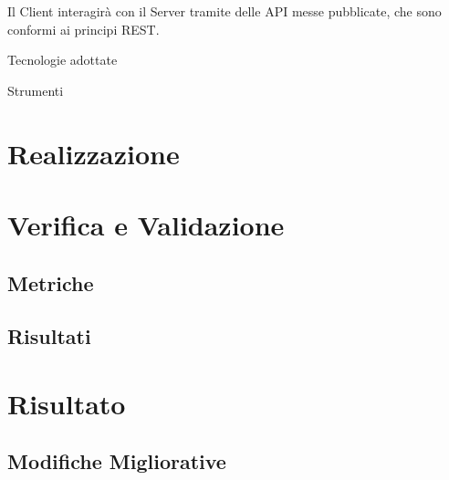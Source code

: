 	Il Client interagirà con il Server tramite delle API messe pubblicate, che sono
	conformi ai principi REST.
	
	Tecnologie adottate
	
	Strumenti

\section{Realizzazione}

\section{Verifica e Validazione}
	\subsection{Metriche}
	
	\subsection{Risultati}

\section{Risultato}
	\subsection{Modifiche Migliorative}
